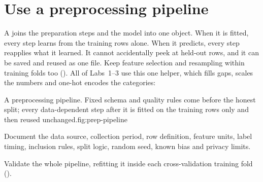 \section{Use a preprocessing pipeline}
\label{sec:preprocessing-pipeline}

A  joins the preparation steps and the model into one object. When it is fitted, every step learns from the training rows alone. When it predicts, every step reapplies what it learned. It cannot accidentally peek at held-out rows, and it can be saved and reused as one file. Keep feature selection and resampling within training folds too (). All of Labs~1--3 use this one helper, which fills gaps, scales the numbers and one-hot encodes the categories:



\begin{utpfig}{A preprocessing pipeline. Fixed schema and quality rules come before the honest split; every data-dependent step after it is fitted on the training rows only and then reused unchanged.}{fig:prep-pipeline}
\end{utpfig}

Document the data source, collection period, row definition, feature units, label timing, inclusion rules, split logic, random seed, known bias and privacy limits.

\begin{keyidea}
Validate the whole pipeline, refitting it inside each cross-validation training fold ().
\end{keyidea}

